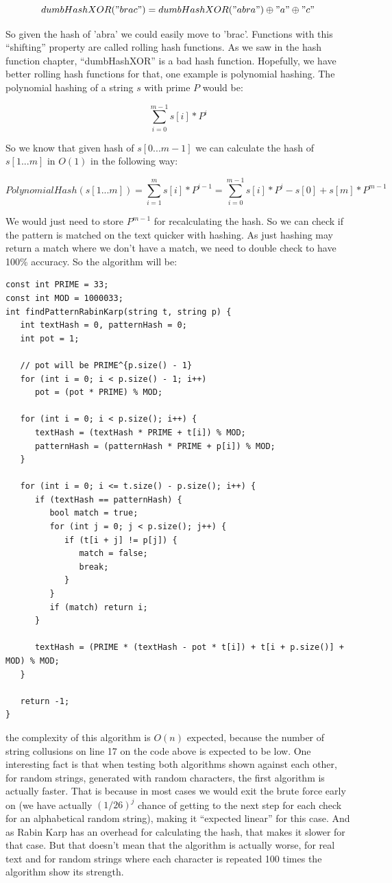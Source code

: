 \[ dumbHashXOR("brac") = dumbHashXOR("abra") \oplus "a" \oplus "c" \]

So given the hash of 'abra' we could easily move to 'brac'. Functions with this ``shifting'' property are called rolling hash functions. As we saw in the hash function chapter, ``dumbHashXOR'' is a bad hash function. Hopefully, we have better rolling hash functions for that, one example is polynomial hashing. The polynomial hashing of a string \( s \) with prime \( P \) would be:

\[ \sum_{i=0}^{m-1}s[i]*P^{i} \]

So we know that given hash of \( s[0...m-1] \) we can calculate the hash of \( s[1...m] \) in \( O(1) \) in the following way:

\[ PolynomialHash(s[1...m]) = \sum_{i=1}^{m}s[i]*P^{i-1} = \sum_{i=0}^{m-1}s[i]*P^{i} - s[0] + s[m] * P^{m-1} \]

We would just need to store \( P^{m-1} \) for recalculating the hash. So we can check if the pattern is matched on the text quicker with hashing. As just hashing may return a match where we don't have a match, we need to double check to have 100\% accuracy. So the algorithm will be:

\begin{lstlisting}
const int PRIME = 33;
const int MOD = 1000033;
int findPatternRabinKarp(string t, string p) {
   int textHash = 0, patternHash = 0;
   int pot = 1;

   // pot will be PRIME^{p.size() - 1}
   for (int i = 0; i < p.size() - 1; i++)
      pot = (pot * PRIME) % MOD;

   for (int i = 0; i < p.size(); i++) {
      textHash = (textHash * PRIME + t[i]) % MOD;
      patternHash = (patternHash * PRIME + p[i]) % MOD;
   }

   for (int i = 0; i <= t.size() - p.size(); i++) {
      if (textHash == patternHash) {
         bool match = true;
         for (int j = 0; j < p.size(); j++) {
            if (t[i + j] != p[j]) {
               match = false;
               break;
            }
         }
         if (match) return i;
      }

      textHash = (PRIME * (textHash - pot * t[i]) + t[i + p.size()] + MOD) % MOD;
   }

   return -1;
}
\end{lstlisting}

the complexity of this algorithm is \( O(n) \) expected, because the number of string collusions on line 17 on the code above is expected to be low. One interesting fact is that when testing both algorithms shown against each other, for random strings, generated with random characters, the first algorithm is actually faster. That is because in most cases we would exit the brute force early on (we have actually \( (1/26)^j \) chance of getting to the next step for each check for an alphabetical random string), making it ``expected linear'' for this case. And as Rabin Karp has an overhead for calculating the hash, that makes it slower for that case. But that doesn't mean that the algorithm is actually worse, for real text and for random strings where each character is repeated 100 times the algorithm show its strength.

